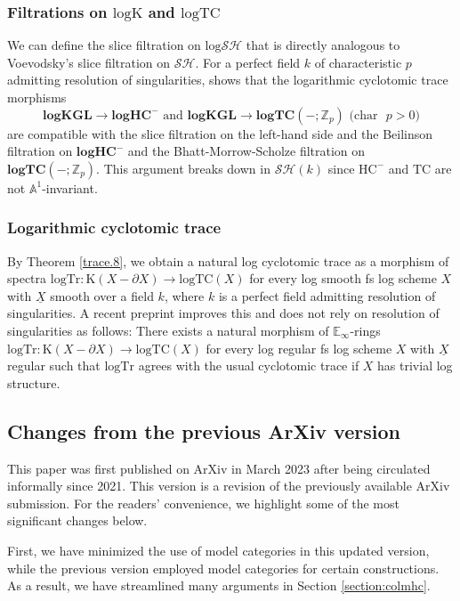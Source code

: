 \documentclass[11pt, a4paper]{amsart}
\theoremstyle{definition}
\numberwithin{equation}{subsection}
\newcommand{\Z}{\mathbb{Z}}
\newcommand{\E}{\mathbb{E}}
\newcommand{\A}{\mathbb{A}}
\newcommand{\TC}{\mathrm{TC}}
\newcommand{\Kth}{\mathrm{K}}
\renewcommand{\ul}{\underline}
\newcommand{\logKGL}{\mathbf{logKGL}}
\newcommand{\logTC}{\mathrm{logTC}}
\newcommand{\logTr}{\mathrm{logTr}}
\newcommand{\spectlogTC}{\mathbf{logTC}}
\newcommand{\Kthlog}{\mathrm{logK}}
\newcommand{\infSH}{\mathcal{SH}}
\newcommand{\inflogSH}{\mathrm{log}\mathcal{SH}}
\begin{document}
\subsubsection{Filtrations on $\Kthlog$ and $\logTC$} 
We can define the slice filtration on $\inflogSH$ that is directly analogous to Voevodsky's slice filtration \cite{MR1977582} on $\infSH$.
For a perfect field $k$ of characteristic $p$ admitting resolution of singularities,
\cite{BPO3} shows that the logarithmic cyclotomic trace morphisms
\[
\logKGL
\to
\mathbf{logHC}^-
\text{ and }
\logKGL
\to
\spectlogTC(-;\Z_p)
\text{ ($\mathrm{char}$ $p>0$)}
\]
are compatible with the slice filtration on the left-hand side and the Beilinson filtration on $\mathbf{logHC}^-$ \cite{BLPO2} and the Bhatt-Morrow-Scholze filtration on $\spectlogTC(-;\Z_p)$.
This argument breaks down in $\infSH(k)$ since $\mathrm{HC}^-$ and $\TC$ are not $\A^1$-invariant.

\subsubsection{Logarithmic cyclotomic trace}

By Theorem \ref{trace.8},
we obtain a natural log cyclotomic trace as a morphism of spectra
\(
\logTr
\colon
\Kth(X-\partial X)
\to
\logTC(X)
\)
for every log smooth fs log scheme $X$ with $\ul{X}$ smooth over a field $k$,
where $k$ is a perfect field admitting resolution of singularities.
A recent preprint \cite[Theorem F]{logSHF1} improves this and does not rely on resolution of singularities as follows: There exists a natural morphism of $\E_\infty$-rings
\(
\logTr
\colon
\Kth(X-\partial X)
\to
\logTC(X)
\)
for every log regular fs log scheme $X$ with $\ul{X}$ regular such that $\logTr$ agrees with the usual cyclotomic trace if $X$ has trivial log structure.




\subsection{Changes from the previous ArXiv version}
This paper was first published on ArXiv in March 2023 after being circulated informally since 2021. This version is a revision of the previously available ArXiv submission. For the readers' convenience, we highlight some of the most significant changes below.

First, we have minimized the use of model categories in this updated version, while the previous version employed model categories for certain constructions. As a result, we have streamlined many arguments in Section \ref{section:colmhc}.
\end{document}
